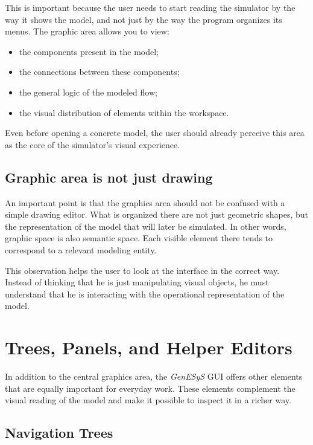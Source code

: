 This is important because the user needs to start reading the simulator by the way it shows the model, and not just by the way the program organizes its menus. The graphic area allows you to view:
\begin{itemize}
\item the components present in the model;
\item the connections between these components;
\item the general logic of the modeled flow;
\item the visual distribution of elements within the workspace.
\end{itemize}

Even before opening a concrete model, the user should already perceive this area as the core of the simulator's visual experience.

\subsection{Graphic area is not just drawing}
\label{subsec:cap3_area_grafica_nao_apenas_desenho}

An important point is that the graphics area should not be confused with a simple drawing editor. What is organized there are not just geometric shapes, but the representation of the model that will later be simulated. In other words, graphic space is also semantic space. Each visible element there tends to correspond to a relevant modeling entity.

This observation helps the user to look at the interface in the correct way. Instead of thinking that he is just manipulating visual objects, he must understand that he is interacting with the operational representation of the model.

\section{Trees, Panels, and Helper Editors}
\label{sec:cap3_arvores_paineis_editores}

In addition to the central graphics area, the \textit{GenESyS} GUI offers other elements that are equally important for everyday work. These elements complement the visual reading of the model and make it possible to inspect it in a richer way.

\subsection{Navigation Trees}
\label{subsec:cap3_arvores_navegacao}

